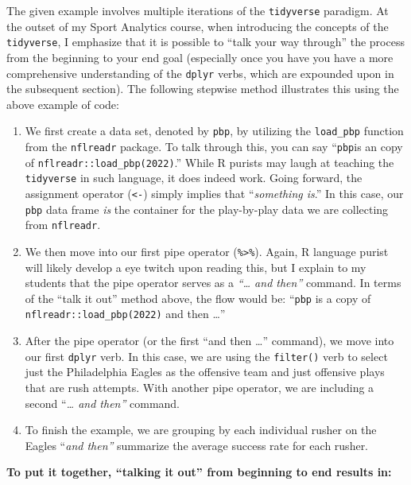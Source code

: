 \documentclass[
  letterpaper,
]{krantz}
\providecommand{\tightlist}{%
  \setlength{\itemsep}{0pt}\setlength{\parskip}{0pt}}\usepackage{longtable,booktabs,array}
\begin{document}
The given example involves multiple iterations of the \texttt{tidyverse}
paradigm. At the outset of my Sport Analytics course, when introducing
the concepts of the \texttt{tidyverse}, I emphasize that it is possible
to ``talk your way through'' the process from the beginning to your end
goal (especially once you have you have a more comprehensive
understanding of the \texttt{dplyr} verbs, which are expounded upon in
the subsequent section). The following stepwise method illustrates this
using the above example of code:

\begin{enumerate}
\def\labelenumi{\arabic{enumi}.}
\tightlist
\item
  We first create a data set, denoted by \texttt{pbp}, by utilizing the
  \texttt{load\_pbp} function from the \texttt{nflreadr} package. To
  talk through this, you can say ``\texttt{pbp}is an copy of
  \texttt{nflreadr::load\_pbp(2022)}.'' While R purists may laugh at
  teaching the \texttt{tidyverse} in such language, it does indeed work.
  Going forward, the assignment operator (\texttt{\textless{}-}) simply
  implies that ``\emph{something is}.'' In this case, our \texttt{pbp}
  data frame \emph{is} the container for the play-by-play data we are
  collecting from \texttt{nflreadr}.
\item
  We then move into our first pipe operator
  (\texttt{\%\textgreater{}\%}). Again, R language purist will likely
  develop a eye twitch upon reading this, but I explain to my students
  that the pipe operator serves as a \emph{``\ldots{} and then''}
  command. In terms of the ``talk it out'' method above, the flow would
  be: ``\texttt{pbp} is a copy of \texttt{nflreadr::load\_pbp(2022)} and
  then \ldots{}''
\item
  After the pipe operator (or the first ``and then \ldots{}'' command),
  we move into our first \texttt{dplyr} verb. In this case, we are using
  the \texttt{filter()} verb to select just the Philadelphia Eagles as
  the offensive team and just offensive plays that are rush attempts.
  With another pipe operator, we are including a second ``\emph{\ldots{}
  and then''} command.
\item
  To finish the example, we are grouping by each individual rusher on
  the Eagles ``\emph{and then''} summarize the average success rate for
  each rusher.
\end{enumerate}

\textbf{To put it together, ``talking it out'' from beginning to end
results in:}
\end{document}
